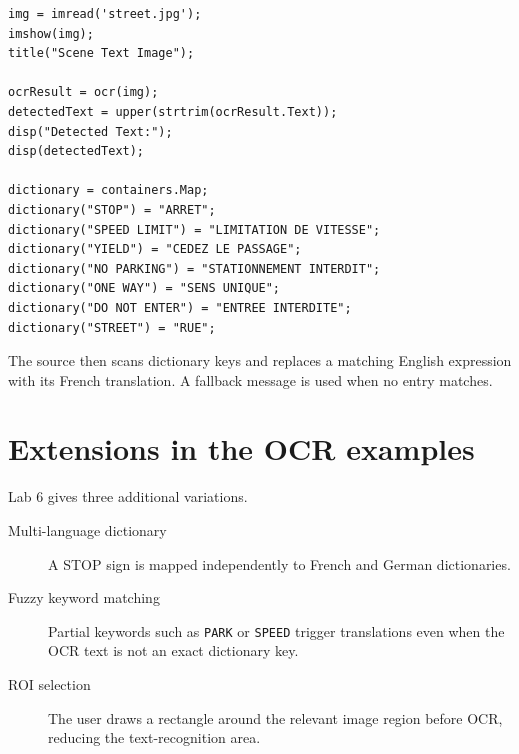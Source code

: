 \begin{mlfigure}
\end{mlfigure}

\begin{lstlisting}[style=mlmatlab]
img = imread('street.jpg');
imshow(img);
title("Scene Text Image");

ocrResult = ocr(img);
detectedText = upper(strtrim(ocrResult.Text));
disp("Detected Text:");
disp(detectedText);

dictionary = containers.Map;
dictionary("STOP") = "ARRET";
dictionary("SPEED LIMIT") = "LIMITATION DE VITESSE";
dictionary("YIELD") = "CEDEZ LE PASSAGE";
dictionary("NO PARKING") = "STATIONNEMENT INTERDIT";
dictionary("ONE WAY") = "SENS UNIQUE";
dictionary("DO NOT ENTER") = "ENTREE INTERDITE";
dictionary("STREET") = "RUE";
\end{lstlisting}

The source then scans dictionary keys and replaces a matching English expression with its French translation. A fallback message is used when no entry matches.

\section{Extensions in the OCR examples}

Lab 6 gives three additional variations.

\begin{description}
  \item[Multi-language dictionary] A STOP sign is mapped independently to French and German dictionaries.
  \item[Fuzzy keyword matching] Partial keywords such as \texttt{PARK} or \texttt{SPEED} trigger translations even when the OCR text is not an exact dictionary key.
  \item[ROI selection] The user draws a rectangle around the relevant image region before OCR, reducing the text-recognition area.
\end{description}

